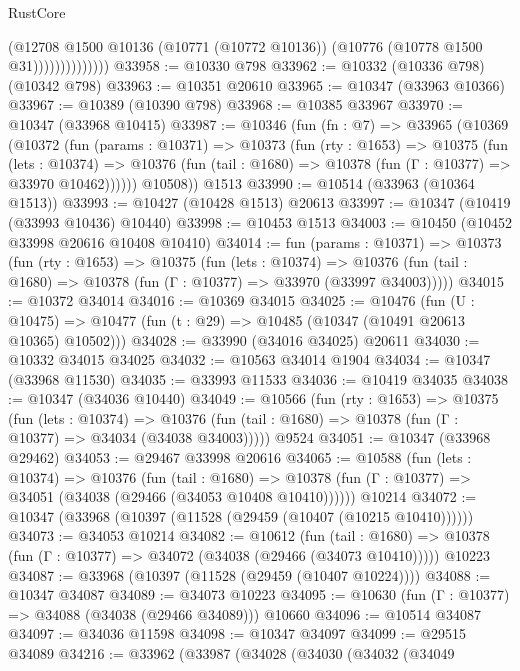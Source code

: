 \begin{lexlean}{RustCore}
\begin{coremodule}
                          (@12708
                            @1500
                            @10136
                            (@10771 (@10772 @10136))
                            (@10776 (@10778 @1500 @31))))))))))))))
@33958 := @10330 @798
@33962 := @10332 (@10336 @798) (@10342 @798)
@33963 := @10351 @20610
@33965 := @10347 (@33963 @10366)
@33967 := @10389 (@10390 @798)
@33968 := @10385 @33967
@33970 := @10347 (@33968 @10415)
@33987 := @10346
    (fun (fn : @7) =>
    @33965
      (@10369
        (@10372
          (fun (params : @10371) =>
          @10373
            (fun (rty : @1653) =>
            @10375
              (fun (lets : @10374) =>
              @10376 (fun (tail : @1680) => @10378 (fun (Γ : @10377) => @33970 @10462))))))
        @10508))
    @1513
@33990 := @10514 (@33963 (@10364 @1513))
@33993 := @10427 (@10428 @1513) @20613
@33997 := @10347 (@10419 (@33993 @10436) @10440)
@33998 := @10453 @1513
@34003 := @10450 (@10452 @33998 @20616 @10408 @10410)
@34014 := fun (params : @10371) =>
  @10373
    (fun (rty : @1653) =>
    @10375
      (fun (lets : @10374) =>
      @10376 (fun (tail : @1680) => @10378 (fun (Γ : @10377) => @33970 (@33997 @34003)))))
@34015 := @10372 @34014
@34016 := @10369 @34015
@34025 := @10476
    (fun (U : @10475) => @10477 (fun (t : @29) => @10485 (@10347 (@10491 @20613 @10365) @10502)))
@34028 := @33990 (@34016 @34025) @20611
@34030 := @10332 @34015 @34025
@34032 := @10563 @34014 @1904
@34034 := @10347 (@33968 @11530)
@34035 := @33993 @11533
@34036 := @10419 @34035
@34038 := @10347 (@34036 @10440)
@34049 := @10566
    (fun (rty : @1653) =>
    @10375
      (fun (lets : @10374) =>
      @10376 (fun (tail : @1680) => @10378 (fun (Γ : @10377) => @34034 (@34038 @34003)))))
    @9524
@34051 := @10347 (@33968 @29462)
@34053 := @29467 @33998 @20616
@34065 := @10588
    (fun (lets : @10374) =>
    @10376
      (fun (tail : @1680) =>
      @10378 (fun (Γ : @10377) => @34051 (@34038 (@29466 (@34053 @10408 @10410))))))
    @10214
@34072 := @10347 (@33968 (@10397 (@11528 (@29459 (@10407 (@10215 @10410))))))
@34073 := @34053 @10214
@34082 := @10612
    (fun (tail : @1680) => @10378 (fun (Γ : @10377) => @34072 (@34038 (@29466 (@34073 @10410)))))
    @10223
@34087 := @33968 (@10397 (@11528 (@29459 (@10407 @10224))))
@34088 := @10347 @34087
@34089 := @34073 @10223
@34095 := @10630 (fun (Γ : @10377) => @34088 (@34038 (@29466 @34089))) @10660
@34096 := @10514 @34087
@34097 := @34036 @11598
@34098 := @10347 @34097
@34099 := @29515 @34089
@34216 := @33962
    (@33987
      (@34028
        (@34030
          (@34032
            (@34049

\end{coremodule}
\end{lexlean}
